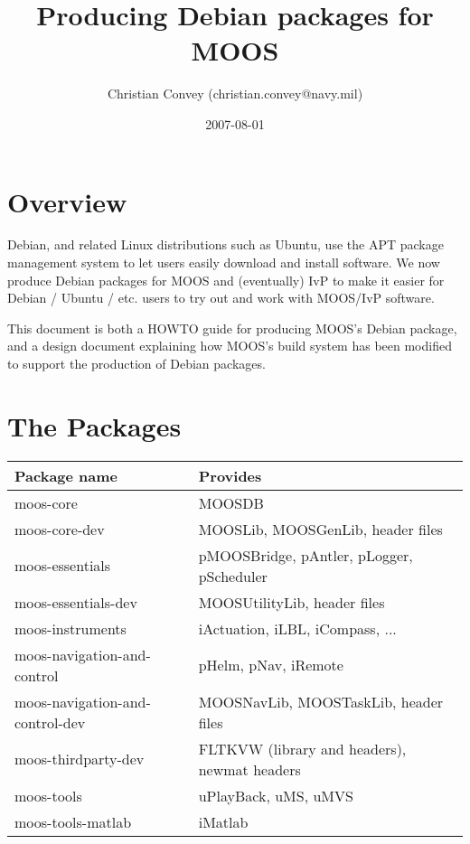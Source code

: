 \documentclass[letterpaper,10pt]{article}
\title{Producing Debian packages for MOOS}
\author{Christian Convey (christian.convey@navy.mil)}
\date{2007-08-01}
\begin{document}
\maketitle

\tableofcontents

\parskip 7.2pt           %

\section{Overview}
Debian, and related Linux distributions such as Ubuntu, use the APT package 
management system to let users easily download and install software.  
We now produce Debian packages for MOOS and (eventually) IvP to make it easier
for Debian / Ubuntu / etc. users to try out and work with MOOS/IvP software.

This document is both a HOWTO guide for producing MOOS's Debian package, and
a design document explaining how MOOS's build system has been modified to support
the production of Debian packages.

\section{The Packages}

\begin{center}
\begin{tabular}{|l|l|}
\hline
Package name & Provides \\ 
\hline
\hline
moos-core & MOOSDB \\ 
moos-core-dev & MOOSLib, MOOSGenLib, header files \\ 
moos-essentials & pMOOSBridge, pAntler, pLogger, pScheduler \\ 
moos-essentials-dev & MOOSUtilityLib, header files \\ 
moos-instruments & iActuation, iLBL, iCompass, ... \\ 
moos-navigation-and-control & pHelm, pNav, iRemote \\ 
moos-navigation-and-control-dev & MOOSNavLib, MOOSTaskLib, header files \\ 
moos-thirdparty-dev & FLTKVW (library and headers), newmat headers \\ 
moos-tools & uPlayBack, uMS, uMVS \\ 
moos-tools-matlab & iMatlab \\
\hline
\end{tabular}
\end{center}
\end{document}

